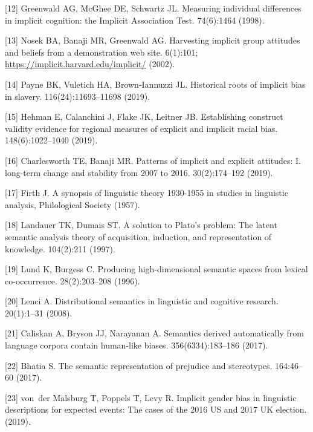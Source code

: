 \documentclass[11pt]{wlscirep}
\begin{document}
[12] Greenwald AG, McGhee DE, Schwartz JL.  Measuring individual differences in
  implicit cognition: the {I}mplicit {A}ssociation {T}est.
 74(6):1464  (1998).

[13] Nosek BA, Banaji MR, Greenwald AG. Harvesting implicit group attitudes
  and beliefs from a demonstration web site.
 6(1):101; \url{https://implicit.harvard.edu/implicit/}  (2002).

[14] Payne BK, Vuletich HA, Brown-Iannuzzi JL. Historical roots of implicit
  bias in slavery.
  116(24):11693--11698  (2019).

[15] Hehman E, Calanchini J, Flake JK, Leitner JB. Establishing construct
  validity evidence for regional measures of explicit and implicit racial bias.
 148(6):1022--1040  (2019).

[16]  Charlesworth TE, Banaji MR. Patterns of implicit and explicit attitudes:
  I. long-term change and stability from 2007 to 2016.
 30(2):174--192 (2019).

[17] Firth J. A synopsis of linguistic theory 1930-1955 in studies in
  linguistic analysis, {P}hilological {S}ociety (1957).

[18] Landauer TK, Dumais ST. A solution to {P}lato's problem: The latent
  semantic analysis theory of acquisition, induction, and representation of
  knowledge.
 104(2):211 (1997).

[19] Lund K, Burgess C. Producing high-dimensional semantic spaces from
  lexical co-occurrence.
  28(2):203--208  (1996).

[20] Lenci A. Distributional semantics in linguistic and cognitive research.
 20(1):1--31  (2008).

[21] Caliskan A, Bryson JJ, Narayanan A. Semantics derived automatically from
  language corpora contain human-like biases.
 356(6334):183--186 (2017).

[22] Bhatia S. The semantic representation of prejudice and stereotypes.
 164:46--60 (2017).

[23] von~der Malsburg T, Poppels T, Levy R. Implicit gender bias in linguistic
  descriptions for expected events: The cases of the 2016 {US} and 2017 {UK}
  election.
 (2019).
\end{document}
